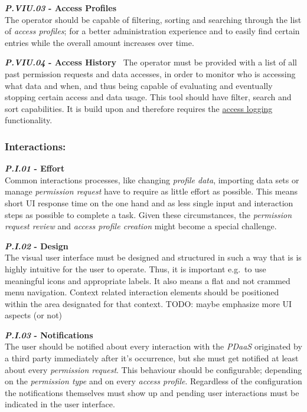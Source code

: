 \documentclass[12pt,english,a4paper,titlepage,cleardoublepage=empty,dottedtoc]{report}
\begin{document}
\textbf{\emph{\protect\hypertarget{pviu03}{}{P.VIU.03}} - Access
Profiles}\\
The operator should be capable of filtering, sorting and searching
through the list of \emph{access profiles}; for a better administration
experience and to easily find certain entries while the overall amount
increases over time.

\textbf{\emph{\protect\hypertarget{pviu04}{}{P.VIU.04}} - Access
History}~ The operator must be provided with a list of all past
permission requests and data accesses, in order to monitor who is
accessing what data and when, and thus being capable of evaluating and
eventually stopping certain access and data usage. This tool should have
filter, search and sort capabilities. It is build upon and therefore
requires the \protect\hyperlink{pb01}{access logging} functionality.

\subsubsection{Interactions:}\label{interactions}

\textbf{\emph{\protect\hypertarget{pi01}{}{P.I.01}} - Effort}\\
Common interactions processes, like changing \emph{profile data},
importing data sets or manage \emph{permission request} have to require
as little effort as possible. This means short UI response time on the
one hand and as less single input and interaction steps as possible to
complete a task. Given these circumstances, the \emph{permission request
review} and \emph{access profile creation} might become a special
challenge.

\textbf{\emph{\protect\hypertarget{pi02}{}{P.I.02}} - Design}\\
The visual user interface must be designed and structured in such a way
that is is highly intuitive for the user to operate. Thus, it is
important e.g.~to use meaningful icons and appropriate labels. It also
means a flat and not crammed menu navigation. Context related
interaction elements should be positioned within the area designated for
that context. TODO: maybe emphasize more UI aspects (or not)

\textbf{\emph{\protect\hypertarget{pi03}{}{P.I.03}} - Notifications}\\
The user should be notified about every interaction with the
\emph{PDaaS} originated by a third party immediately after it's
occurrence, but she must get notified at least about every
\emph{permission request}. This behaviour should be configurable;
depending on the \emph{permission type} and on every \emph{access
profile}. Regardless of the configuration the notifications themselves
must show up and pending user interactions must be indicated in the user
interface.
\end{document}
